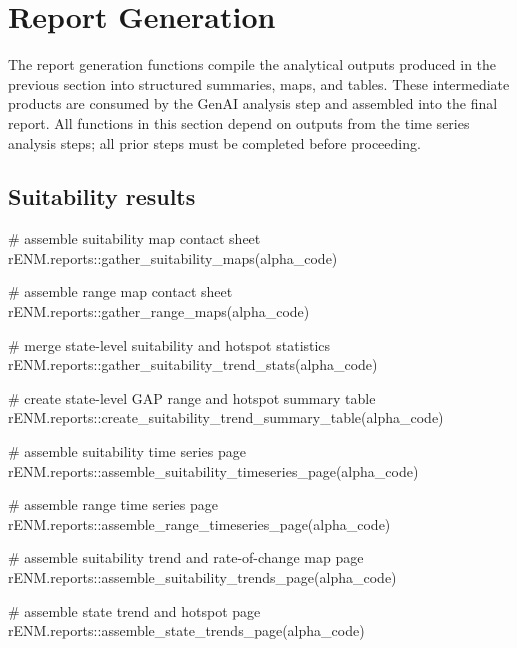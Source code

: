 \documentclass[
  letterpaper,
  DIV=11,
  numbers=noendperiod]{scrartcl}
\newenvironment{Shaded}{\begin{snugshade}}{\end{snugshade}}
\newcommand{\CommentTok}[1]{\textcolor[rgb]{0.37,0.37,0.37}{#1}}
\newcommand{\FunctionTok}[1]{\textcolor[rgb]{0.28,0.35,0.67}{#1}}
\newcommand{\NormalTok}[1]{\textcolor[rgb]{0.00,0.23,0.31}{#1}}
\newcommand{\SpecialCharTok}[1]{\textcolor[rgb]{0.37,0.37,0.37}{#1}}
\begin{document}
\section{Report Generation}\label{report-generation}

The report generation functions compile the analytical outputs produced
in the previous section into structured summaries, maps, and tables.
These intermediate products are consumed by the GenAI analysis step and
assembled into the final report. All functions in this section depend on
outputs from the time series analysis steps; all prior steps must be
completed before proceeding.

\subsection{Suitability results}\label{suitability-results}

\begin{Shaded}
\begin{Highlighting}[]
\CommentTok{\# assemble suitability map contact sheet}
\NormalTok{rENM.reports}\SpecialCharTok{::}\FunctionTok{gather\_suitability\_maps}\NormalTok{(alpha\_code)}

\CommentTok{\# assemble range map contact sheet}
\NormalTok{rENM.reports}\SpecialCharTok{::}\FunctionTok{gather\_range\_maps}\NormalTok{(alpha\_code)}

\CommentTok{\# merge state{-}level suitability and hotspot statistics}
\NormalTok{rENM.reports}\SpecialCharTok{::}\FunctionTok{gather\_suitability\_trend\_stats}\NormalTok{(alpha\_code)}

\CommentTok{\# create state{-}level GAP range and hotspot summary table}
\NormalTok{rENM.reports}\SpecialCharTok{::}\FunctionTok{create\_suitability\_trend\_summary\_table}\NormalTok{(alpha\_code)}

\CommentTok{\# assemble suitability time series page}
\NormalTok{rENM.reports}\SpecialCharTok{::}\FunctionTok{assemble\_suitability\_timeseries\_page}\NormalTok{(alpha\_code)}

\CommentTok{\# assemble range time series page}
\NormalTok{rENM.reports}\SpecialCharTok{::}\FunctionTok{assemble\_range\_timeseries\_page}\NormalTok{(alpha\_code)}

\CommentTok{\# assemble suitability trend and rate{-}of{-}change map page}
\NormalTok{rENM.reports}\SpecialCharTok{::}\FunctionTok{assemble\_suitability\_trends\_page}\NormalTok{(alpha\_code)}

\CommentTok{\# assemble state trend and hotspot page}
\NormalTok{rENM.reports}\SpecialCharTok{::}\FunctionTok{assemble\_state\_trends\_page}\NormalTok{(alpha\_code)}
\end{Highlighting}
\end{Shaded}
\end{document}

